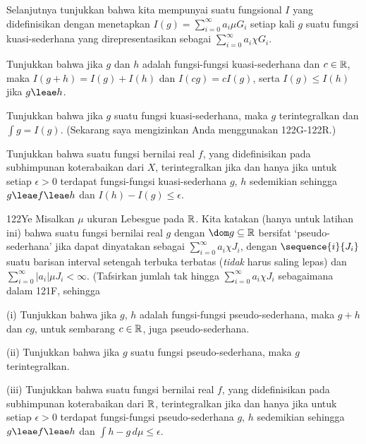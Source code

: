 { Selanjutnya tunjukkan bahwa kita mempunyai suatu
fungsional $I$ yang didefinisikan dengan menetapkan
$I(g)=\sum_{i=0}^{\infty}a_i\mu G_i$ setiap kali $g$ suatu fungsi
kuasi-sederhana yang direpresentasikan sebagai
$\sum_{i=0}^{\infty}a_i\chi G_i$.

 Tunjukkan bahwa jika $g$ dan $h$ adalah fungsi-fungsi
kuasi-sederhana dan $c\in\Bbb R$, maka $I(g+h)=I(g)+I(h)$ dan
$I(cg)=cI(g)$, serta $I(g)\le I(h)$ jika $g\leae h$.

 Tunjukkan bahwa jika $g$ suatu fungsi kuasi-sederhana, maka
$g$ terintegralkan dan $\int g=I(g)$. (Sekarang saya mengizinkan Anda
menggunakan 122G-122R.)

 Tunjukkan bahwa suatu fungsi bernilai real $f$, yang
didefinisikan pada subhimpunan koterabaikan dari $X$, terintegralkan jika
dan hanya jika untuk setiap $\epsilon>0$ terdapat fungsi-fungsi
kuasi-sederhana $g$, $h$ sedemikian sehingga $g\leae f\leae h$ dan
$I(h)-I(g)\le\epsilon$.

\spheader 122Ye Misalkan $\mu$ ukuran Lebesgue pada $\Bbb R$. Kita
katakan (hanya untuk latihan ini) bahwa suatu fungsi bernilai real $g$
dengan $\dom g\subseteq\Bbb R$ bersifat `pseudo-sederhana' jika dapat
dinyatakan sebagai $\sum_{i=0}^{\infty}a_i\chi J_i$, dengan
$\sequence{i}{J_i}$ suatu barisan interval setengah terbuka terbatas
({\it tidak} harus saling lepas) dan
$\sum_{i=0}^{\infty}|a_i|\mu J_i<\infty$. (Tafsirkan jumlah tak hingga
$\sum_{i=0}^{\infty}a_i\chi J_i$ sebagaimana dalam 121F, sehingga


\quad(i) Tunjukkan bahwa jika $g$, $h$ adalah fungsi-fungsi
pseudo-sederhana, maka $g+h$ dan $cg$, untuk sembarang $c\in \Bbb R$,
juga pseudo-sederhana.

\quad(ii) Tunjukkan bahwa jika $g$ suatu fungsi pseudo-sederhana, maka
$g$ terintegralkan.

\quad(iii) Tunjukkan bahwa suatu fungsi bernilai real $f$, yang
didefinisikan pada subhimpunan koterabaikan dari $\Bbb R$,
terintegralkan jika dan hanya jika untuk setiap $\epsilon>0$ terdapat
fungsi-fungsi pseudo-sederhana $g$, $h$ sedemikian sehingga
$g\leae f\leae h$ dan $\int h-g\,d\mu\le\epsilon$. 

}
